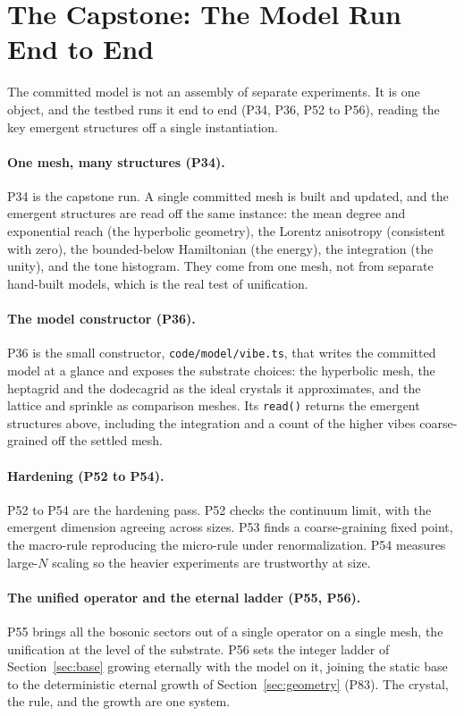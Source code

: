 \section{The Capstone: The Model Run End to End}
\label{sec:capstone}

The committed model is not an assembly of separate experiments. It is one object, and the testbed
runs it end to end (P34, P36, P52 to P56), reading the key emergent structures off a single
instantiation.

\paragraph{One mesh, many structures (P34).}
P34 is the capstone run. A single committed mesh is built and updated, and the emergent structures
are read off the same instance: the mean degree and exponential reach (the hyperbolic geometry), the
Lorentz anisotropy (consistent with zero), the bounded-below Hamiltonian (the energy), the
integration (the unity), and the tone histogram. They come from one mesh, not from separate
hand-built models, which is the real test of unification.

\paragraph{The model constructor (P36).}
P36 is the small constructor, \texttt{code/model/vibe.ts}, that writes the committed model at a
glance and exposes the substrate choices: the hyperbolic mesh, the heptagrid and the dodecagrid as
the ideal crystals it approximates, and the lattice and sprinkle as comparison meshes. Its
\texttt{read()} returns the emergent structures above, including the integration and a count of the
higher vibes coarse-grained off the settled mesh.

\paragraph{Hardening (P52 to P54).}
P52 to P54 are the hardening pass. P52 checks the continuum limit, with the emergent dimension
agreeing across sizes. P53 finds a coarse-graining fixed point, the macro-rule reproducing the
micro-rule under renormalization. P54 measures large-$N$ scaling so the heavier experiments are
trustworthy at size.

\paragraph{The unified operator and the eternal ladder (P55, P56).}
P55 brings all the bosonic sectors out of a single operator on a single mesh, the unification at
the level of the substrate. P56 sets the integer ladder of Section~\ref{sec:base} growing eternally
with the model on it, joining the static base to the deterministic eternal growth of
Section~\ref{sec:geometry} (P83). The crystal, the rule, and the growth are one system.
